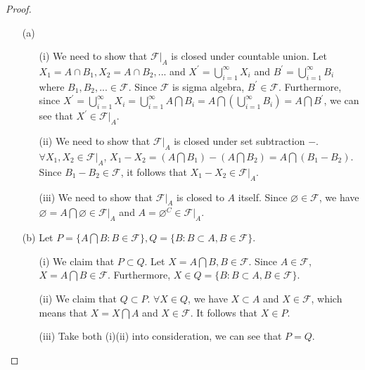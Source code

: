 \begin{proof}
    \begin{enumerate}
        \item[(a)] \begin{enumerate}
                \item[(i)] We need to show that $\mathcal{F}|_A$ is closed under countable union. Let $X_1=A\cap B_1,X_2=A\cap B_2,...$ and $X^{\prime}=\bigcup\limits^{\infty}_{i=1}X_i$ and $B^{\prime}=\bigcup\limits^{\infty}_{i=1}B_i$ where $B_1,B_2,...\in \mathcal{F}$. Since $\mathcal{F}$ is sigma algebra, $B^{\prime}\in \mathcal{F}$. Furthermore, since $X^{\prime}=\bigcup^{\infty}_{i=1}X_i=\bigcup^{\infty}_{i=1}A\bigcap B_i=A\bigcap\left(\bigcup\limits^{\infty}_{i=1}B_i \right)=A\bigcap B^{\prime}$, we can see that $X^{\prime}\in \mathcal{F}|_A$.
                \item[(ii)] We need to show that $\mathcal{F}|_A$ is closed under set subtraction $-$. $\forall X_1,X_2\in \mathcal{F}|_A$, $X_1-X_2=(A\bigcap B_1)-(A\bigcap B_2)=A\bigcap(B_1-B_2)$. Since $B_1-B_2\in \mathcal{F}$, it follows that $X_1-X_2\in \mathcal{F}|_A$.
                \item[(iii)] We need to show that $\mathcal{F}|_A$ is closed to $A$ itself. Since $\varnothing \in \mathcal{F}$, we have $\varnothing=A\bigcap\varnothing\in \mathcal{F}|_A$ and $A=\varnothing^{C}\in \mathcal{F}|_A$.
              \end{enumerate}
        \item[(b)] Let $P=\{ A\bigcap B:B\in \mathcal{F} \}, Q=\{ B: B\subset A, B\in \mathcal{F} \}$.
                \begin{enumerate}
                    \item[(i)] We claim that $P\subset Q$. Let $X=A\bigcap B, B\in \mathcal{F}$. Since $A\in \mathcal{F}$, $X=A\bigcap B\in \mathcal{F}$. Furthermore, $X\in Q=\{B:B\subset A, B\in \mathcal{F} \}$.
                    \item[(ii)] We claim that $Q\subset P$. $\forall X\in Q$, we have $X\subset A$ and $X\in \mathcal{F}$, which means that $X=X\bigcap A$ and $X\in \mathcal{F}$. It follows that $X\in P$.
                    \item[(iii)] Take both (i)(ii) into consideration, we can see that $P=Q$.
                \end{enumerate}
        \end{enumerate}
\end{proof}


